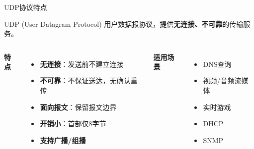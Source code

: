 \documentclass[10pt, aspectratio=169]{beamer}
\begin{document}
\begin{frame}{UDP协议特点}
    \begin{block}{UDP (User Datagram Protocol)}
        用户数据报协议，提供\textbf{无连接、不可靠}的传输服务。
    \end{block}
    \vspace{0.3em}
    \begin{columns}[t]
        \textbf{特点}
        \begin{itemize}
            \item \textbf{无连接}：发送前不建立连接
            \item \textbf{不可靠}：不保证送达，无确认重传
            \item \textbf{面向报文}：保留报文边界
            \item \textbf{开销小}：首部仅8字节
            \item \textbf{支持广播/组播}
        \end{itemize}
        \textbf{适用场景}
        \begin{itemize}
            \item DNS查询
            \item 视频/音频流媒体
            \item 实时游戏
            \item DHCP
            \item SNMP
        \end{itemize}
    \end{columns}
\end{frame}
\end{document}
